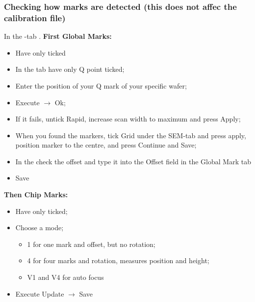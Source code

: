 \subsubsection{Checking how marks are detected (this does not affec the calibration file)}
In    the   -tab   \ra    {}.    \textbf{First   Global
  Marks:}
\begin{itemize}
\item Have only  ticked
\item  In the    tab have  only Q  point
  ticked;
\item Enter the position of your Q mark of your specific
  wafer;
\item Execute $\rightarrow$ Ok;
\item If it fails, untick  Rapid, increase scan width to
  maximum and press Apply;
\item When  you found the  markers, tick Grid  under the
  SEM-tab  and  press  apply,  position  marker  to  the
  centre, and press Continue and Save;
\item In the  check  the offset and type it into
  the Offset field in the Global Mark tab
\item Save 
\end{itemize}
\textbf{Then Chip Marks:}
\begin{itemize}
\item Have only  ticked;
\item Choose a mode;
  \begin{itemize}
  \item 1 for one mark and offset, but no rotation;
  \item 4 for four marks and rotation, measures position
    and height;
  \item V1 and V4 for auto focus
  \end{itemize}
\item Execute \ra Update $\rightarrow$ Save
\end{itemize}

